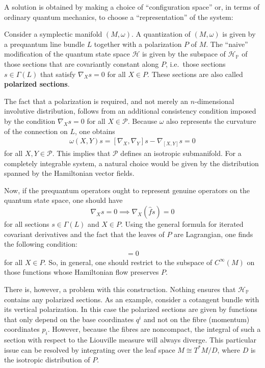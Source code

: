     A solution is obtained by making a choice of ``configuration space'' or, in terms of ordinary quantum mechanics, to choose a ``representation'' of the system:
    \begin{construct}[Quantization]
        Consider a symplectic manifold $(M,\omega)$. A quantization of $(M,\omega)$ is given by a prequantum line bundle $L$ together with a polarization $P$ of $M$. The ``naive'' modification of the quantum state space $\mathcal{H}$ is given by the subspace of $\mathcal{H}_\mathbb{P}$ of those sections that are covariantly constant along $P$, i.e.~those sections $s\in\Gamma(L)$ that satisfy $\nabla_Xs=0$ for all $X\in P$. These sections are also called \textbf{polarized sections}.

        The fact that a polarization is required, and not merely an $n$-dimensional involutive distribution, follows from an additional consistency condition imposed by the condition $\nabla_Xs=0$ for all $X\in\mathcal{P}$. Because $\omega$ also represents the curvature of the connection on $L$, one obtains
        \begin{gather}
            \omega(X,Y)s = [\nabla_X,\nabla_Y]s - \nabla_{[X,Y]}s = 0
        \end{gather}
        for all $X,Y\in\mathcal{P}$. This implies that $\mathcal{P}$ defines an isotropic submanifold. For a completely integrable system, a natural choice would be given by the distribution spanned by the Hamiltonian vector fields.

        Now, if the prequantum operators ought to represent genuine operators on the quantum state space, one should have \[\nabla_Xs=0\implies\nabla_X(\hat{f}s)=0\] for all sections $s\in\Gamma(L)$ and $X\in P$. Using the general formula for iterated covariant derivatives and the fact that the leaves of $P$ are Lagrangian, one finds the following condition:
        \begin{gather}
            [X,X_f]=0
        \end{gather}
        for all $X\in P$. So, in general, one should restrict to the subspace of $C^\infty(M)$ on those functions whose Hamiltonian flow preserves $P$.

        There is, however, a problem with this construction. Nothing ensures that $\mathcal{H}_\mathbb{P}$ contains any polarized sections. As an example, consider a cotangent bundle with its vertical polarization. In this case the polarized sections are given by functions that only depend on the base coordinates $q^i$ and not on the fibre (momentum) coordinates $p_i$. However, because the fibres are noncompact, the integral of such a section with respect to the Liouville measure will always diverge. This particular issue can be resolved by integrating over the leaf space $M\cong T^*M/D$, where $D$ is the isotropic distribution of $P$.
    \end{construct}

